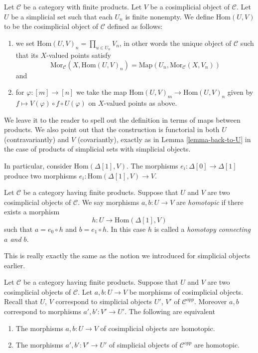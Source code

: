 \begin{definition}
\label{definition-hom-deltak-cosimplicial}
Let $\mathcal{C}$ be a category with finite products.
Let $V$ be a cosimplicial object of $\mathcal{C}$.
Let $U$ be a simplicial set such that each
$U_n$ is finite nonempty.
We define {\it $\text{Hom}(U, V)$} to be
the cosimplicial object of $\mathcal{C}$ defined
as follows:
\begin{enumerate}
\item we set $\text{Hom}(U, V)_n = \prod_{u \in U_n} V_n$,
in other words the unique object of $\mathcal{C}$ such
that its $X$-valued points satisfy
$$
\text{Mor}_\mathcal{C}(X, \text{Hom}(U, V)_n)
=
\text{Map}(U_n, \text{Mor}_\mathcal{C}(X, V_n))
$$
and
\item for $\varphi : [m] \to [n]$ we take the map
$\text{Hom}(U, V)_m \to \text{Hom}(U, V)_n$
given by $f \mapsto V(\varphi) \circ f \circ U(\varphi)$
on $X$-valued points as above.
\end{enumerate}
\end{definition}

\noindent
We leave it to the reader to spell out the
definition in terms of maps between products.
We also point out that the construction is functorial
in both $U$ (contravariantly) and $V$ (covariantly), exactly as in
Lemma \ref{lemma-back-to-U} in the case of
products of simplicial sets with simplicial objects.

\medskip\noindent
In particular, consider $\text{Hom}(\Delta[1], V)$.
The morphisms $e_i : \Delta[0] \to \Delta[1]$
produce two morphisms $e_i : \text{Hom}(\Delta[1], V) \to V$.

\begin{definition}
\label{definition-homotopy-cosimplicial}
Let $\mathcal{C}$ be a category having finite products.
Suppose that $U$ and $V$ are two cosimplicial objects
of $\mathcal{C}$.
We say morphisms $a, b : U \to V$ are {\it homotopic}
if there exists a morphism
$$
h : U \longrightarrow \text{Hom}(\Delta[1], V)
$$
such that $a = e_0 \circ h$ and $b = e_1 \circ h$.
In this case $h$ is called a {\it homotopy connecting
$a$ and $b$}.
\end{definition}

\noindent
This is really exactly the same as the notion we
introduced for simplicial objects earlier.

\begin{lemma}
\label{lemma-compare-homotopies}
Let $\mathcal{C}$ be a category having finite products.
Suppose that $U$ and $V$ are two cosimplicial objects
of $\mathcal{C}$. Let $a, b : U \to V$ be morphisms
of cosimplicial objects. Recall that $U$, $V$ correspond
to simplicial objects $U'$, $V'$ of $\mathcal{C}^{opp}$.
Moreover $a, b$ correspond to morphisms $a', b' : V' \to U'$.
The following are equivalent
\begin{enumerate}
\item The morphisms $a, b : U \to V$ of cosimplicial
objects are homotopic.
\item The morphisms $a', b' : V' \to U'$ of simplicial objects
of $\mathcal{C}^{opp}$ are homotopic.
\end{enumerate}
\end{lemma}

